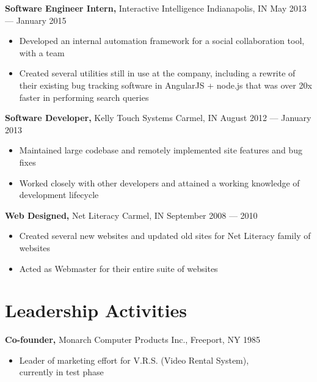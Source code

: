 \documentclass[margin]{res}
\begin{document}
\begin{resume}
 {\bf Software Engineer Intern,} Interactive Intelligence Indianapolis, IN \hfill May 2013 –– January 2015
 \begin{itemize} \itemsep -2pt  %
 
   \item Developed an internal automation framework for a social collaboration tool, with a team
 
   \item Created several utilities still in use at the company, including a rewrite of their existing bug tracking software in AngularJS + node.js that was over 20x faster in performing search queries
 
 \end{itemize}


 {\bf Software Developer,} Kelly Touch Systems Carmel, IN \hfill August 2012 –– January 2013
 \begin{itemize} \itemsep -2pt  %
 
   \item Maintained large codebase and remotely implemented site features and bug fixes
 
   \item Worked closely with other developers and attained a working knowledge of development lifecycle
 
 \end{itemize}


 {\bf Web Designed,} Net Literacy Carmel, IN \hfill September 2008 –– 2010
 \begin{itemize} \itemsep -2pt  %
 
   \item Created several new websites and updated old sites for Net Literacy family of websites
 
   \item Acted as Webmaster for their entire suite of websites
 
 \end{itemize}



\section{Leadership   Activities} 
               {\bf Co-founder,} Monarch Computer Products Inc., Freeport, NY    \hfill         1985 
                \begin{itemize} \itemsep -2pt
              \item Leader of marketing effort for V.R.S. (Video 
                 Rental System), \\
                  currently in test phase 
                 

\end{itemize}
\end{resume}
\end{document}
